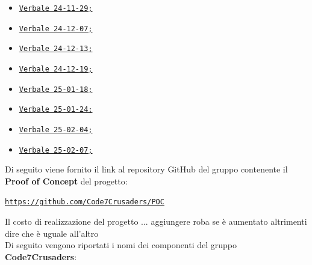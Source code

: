 \documentclass{article}
\begin{document}
\begin{itemize}
\begin{itemize}
            \item \href{https://code7crusaders.github.io/docs/RTB/verbali_interni/verbale_24-11-29_v1.0.html}{\texttt{Verbale 24-11-29;}}
            \item \href{https://code7crusaders.github.io/docs/RTB/verbali_interni/verbale_24-12-07_v1.0.html}{\texttt{Verbale 24-12-07;}}
            \item \href{https://code7crusaders.github.io/docs/RTB/verbali_interni/verbale_24-12-13_v1.0.html}{\texttt{Verbale 24-12-13;}}
            \item \href{https://code7crusaders.github.io/docs/RTB/verbali_interni/verbale_24-12-19_v1.0.html}{\texttt{Verbale 24-12-19;}}
            \item \href{https://code7crusaders.github.io/docs/RTB/verbali_interni/verbale_25-01-18_v1.0.html}{\texttt{Verbale 25-01-18;}}
            \item \href{https://code7crusaders.github.io/docs/RTB/verbali_interni/verbale_25-01-24_v1.0.html}{\texttt{Verbale 25-01-24;}}
            \item \href{https://code7crusaders.github.io/docs/RTB/verbali_interni/verbale_25-02-04_v1.0.html}{\texttt{Verbale 25-02-04;}}
            \item \href{https://code7crusaders.github.io/docs/RTB/verbali_interni/verbale_25-02-07_v1.0.html}{\texttt{Verbale 25-02-07;}}
        \end{itemize}
\end{itemize}

Di seguito viene fornito il link al repository GitHub del gruppo contenente il \textbf{Proof of Concept} del progetto:
\begin{center}
    \texttt{\url{https://github.com/Code7Crusaders/POC}}
\end{center}
Il costo di realizzazione del progetto ... aggiungere roba se è aumentato altrimenti dire che è uguale all'altro\\
\newpage
Di seguito vengono riportati i nomi dei componenti del gruppo \textbf{Code7Crusaders}:\\
\end{document}

